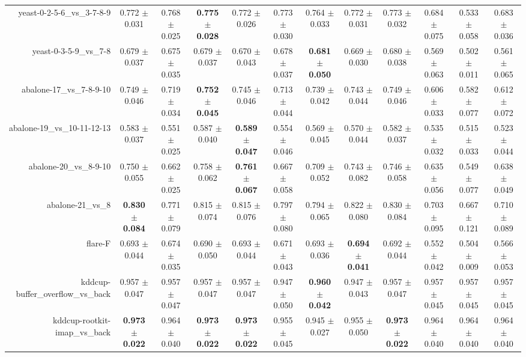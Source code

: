 \begin{table}[!ht]
{\begin{tabular}{r c c c c c c c c c c c}
yeast-0-2-5-6\_vs\_3-7-8-9 & 0.772 $\pm$ 0.031 & 0.768 $\pm$ 0.025 & \textbf{0.775 $\pm$ 0.028} & 0.772 $\pm$ 0.026 & 0.773 $\pm$ 0.030 & 0.764 $\pm$ 0.033 & 0.772 $\pm$ 0.031 & 0.773 $\pm$ 0.032 & 0.684 $\pm$ 0.075 & 0.533 $\pm$ 0.058 & 0.683 $\pm$ 0.036 \\
yeast-0-3-5-9\_vs\_7-8 & 0.679 $\pm$ 0.037 & 0.675 $\pm$ 0.035 & 0.679 $\pm$ 0.037 & 0.670 $\pm$ 0.043 & 0.678 $\pm$ 0.037 & \textbf{0.681 $\pm$ 0.050} & 0.669 $\pm$ 0.030 & 0.680 $\pm$ 0.038 & 0.569 $\pm$ 0.063 & 0.502 $\pm$ 0.011 & 0.561 $\pm$ 0.065 \\
abalone-17\_vs\_7-8-9-10 & 0.749 $\pm$ 0.046 & 0.719 $\pm$ 0.034 & \textbf{0.752 $\pm$ 0.045} & 0.745 $\pm$ 0.046 & 0.713 $\pm$ 0.044 & 0.739 $\pm$ 0.042 & 0.743 $\pm$ 0.044 & 0.749 $\pm$ 0.046 & 0.606 $\pm$ 0.033 & 0.582 $\pm$ 0.077 & 0.612 $\pm$ 0.072 \\
abalone-19\_vs\_10-11-12-13 & 0.583 $\pm$ 0.037 & 0.551 $\pm$ 0.025 & 0.587 $\pm$ 0.040 & \textbf{0.589 $\pm$ 0.047} & 0.554 $\pm$ 0.046 & 0.569 $\pm$ 0.045 & 0.570 $\pm$ 0.044 & 0.582 $\pm$ 0.037 & 0.535 $\pm$ 0.032 & 0.515 $\pm$ 0.033 & 0.523 $\pm$ 0.044 \\
abalone-20\_vs\_8-9-10 & 0.750 $\pm$ 0.055 & 0.662 $\pm$ 0.025 & 0.758 $\pm$ 0.062 & \textbf{0.761 $\pm$ 0.067} & 0.667 $\pm$ 0.058 & 0.709 $\pm$ 0.052 & 0.743 $\pm$ 0.082 & 0.746 $\pm$ 0.058 & 0.635 $\pm$ 0.056 & 0.549 $\pm$ 0.077 & 0.638 $\pm$ 0.049 \\
abalone-21\_vs\_8 & \textbf{0.830 $\pm$ 0.084} & 0.771 $\pm$ 0.079 & 0.815 $\pm$ 0.074 & 0.815 $\pm$ 0.076 & 0.797 $\pm$ 0.080 & 0.794 $\pm$ 0.065 & 0.822 $\pm$ 0.080 & 0.830 $\pm$ 0.084 & 0.703 $\pm$ 0.095 & 0.667 $\pm$ 0.121 & 0.710 $\pm$ 0.089 \\
flare-F & 0.693 $\pm$ 0.044 & 0.674 $\pm$ 0.035 & 0.690 $\pm$ 0.050 & 0.693 $\pm$ 0.044 & 0.671 $\pm$ 0.043 & 0.693 $\pm$ 0.036 & \textbf{0.694 $\pm$ 0.041} & 0.692 $\pm$ 0.044 & 0.552 $\pm$ 0.042 & 0.504 $\pm$ 0.009 & 0.566 $\pm$ 0.053 \\
kddcup-buffer\_overflow\_vs\_back & 0.957 $\pm$ 0.047 & 0.957 $\pm$ 0.047 & 0.957 $\pm$ 0.047 & 0.957 $\pm$ 0.047 & 0.947 $\pm$ 0.050 & \textbf{0.960 $\pm$ 0.042} & 0.947 $\pm$ 0.043 & 0.957 $\pm$ 0.047 & 0.957 $\pm$ 0.045 & 0.957 $\pm$ 0.045 & 0.957 $\pm$ 0.045 \\
kddcup-rootkit-imap\_vs\_back & \textbf{0.973 $\pm$ 0.022} & 0.964 $\pm$ 0.040 & \textbf{0.973 $\pm$ 0.022} & \textbf{0.973 $\pm$ 0.022} & 0.955 $\pm$ 0.045 & 0.945 $\pm$ 0.027 & 0.955 $\pm$ 0.050 & \textbf{0.973 $\pm$ 0.022} & 0.964 $\pm$ 0.040 & 0.964 $\pm$ 0.040 & 0.964 $\pm$ 0.040 \\

\end{tabular}}
\end{table}
